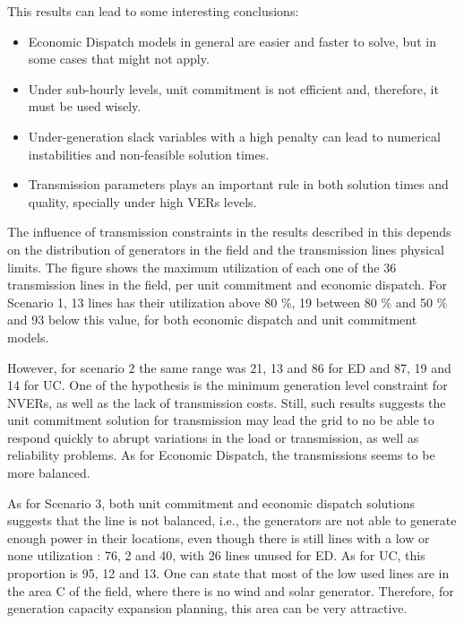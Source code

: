 \documentclass[12pt,LUDisStyle,twosided]{book}
\begin{document}
This results can lead to some interesting conclusions:

\begin{itemize}
\item Economic Dispatch models in general are easier and faster to solve, but in some cases that might not apply.
\item Under sub-hourly levels, unit commitment is not efficient and, therefore, it must be used wisely.
\item Under-generation slack variables with a high penalty can lead to numerical instabilities and non-feasible solution times.
\item Transmission parameters plays an important rule in both solution times and quality, specially under high VERs levels.
\end{itemize}

The influence of transmission constraints in the results described in this depends on the distribution of generators in the field and the transmission lines physical limits. The figure \label{fig:maximumutilizaton} shows the maximum utilization of each one of the 36 transmission lines in the field, per unit commitment and economic dispatch. For Scenario 1, 13 lines has their utilization above 80 \%,  19 between 80 \% and 50 \% and 93 below this value, for both economic dispatch and unit commitment models. 

However, for scenario 2 the same range was 21, 13 and 86 for ED and 87, 19 and 14 for UC. One of the hypothesis is the minimum generation level constraint for NVERs, as well as the lack of transmission costs. Still, such results suggests the unit commitment solution for transmission may lead the grid to no be able to respond quickly to abrupt variations in the load or transmission, as well as reliability problems. As for Economic Dispatch, the transmissions seems to be more balanced.

As for Scenario 3, both unit commitment and economic dispatch solutions suggests that the line is not balanced, i.e., the generators are not able to generate enough power in their locations, even though there is still lines with a low or none utilization : 76, 2 and 40, with 26 lines unused for ED. As for UC, this proportion is 95, 12 and 13. One can state that most of the low used lines are in the area C of the field, where there is no wind and solar generator. Therefore, for generation capacity expansion planning, this area can be very attractive.
\end{document}
